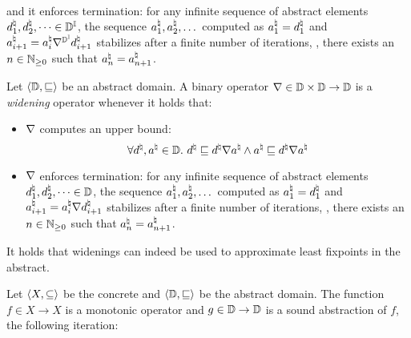\begin{description}
\begin{align*}
  \end{align*}
  and it enforces termination: for any infinite sequence of abstract elements $d^\natural_1, d^\natural_2, \dots \in \mathbb{D}^{\mathbb{I}}$, the sequence $a^\natural_1, a^\natural_2, \dots$ computed as $a^\natural_1 = d^\natural_1$ and $a^\natural_{i+1} = a^\natural_i \nabla^{\mathbb{D}^{\mathbb{I}}} d^\natural_{i+1}$ stabilizes after a finite number of iterations, \ie, there exists an $n \in \mathbb{N}_{\ge0}$ such that $a^\natural_n = a^\natural_{n+1}$.
  \begin{definition}[Widening]
    Let $\langle \mathbb{D}, \sqsubseteq \rangle$ be an abstract domain.
    A binary operator $\nabla\in\mathbb{D}\times\mathbb{D}\to\mathbb{D}$ is a \emph{widening} operator whenever it holds that:
    \begin{itemize}
      \item $\nabla$ computes an upper bound:
      \[\forall d^\natural, a^\natural \in \mathbb{D}.~ d^\natural \sqsubseteq d^\natural \nabla a^\natural \land a^\natural \sqsubseteq d^\natural \nabla a^\natural\]
      \item $\nabla$ enforces termination: for any infinite sequence of abstract elements $d^\natural_1, d^\natural_2, \dots \in \mathbb{D}$, the sequence $a^\natural_1, a^\natural_2, \dots$ computed as $a^\natural_1 = d^\natural_1$ and $a^\natural_{i+1} = a^\natural_i \nabla d^\natural_{i+1}$ stabilizes after a finite number of iterations, \ie, there exists an $n \in \mathbb{N}_{\ge0}$ such that $a^\natural_n = a^\natural_{n+1}$.
    \end{itemize}
  \end{definition}
  \vspace{5pt}
  It holds that widenings can indeed be used to approximate least fixpoints in the abstract.
  \begin{theorem}
    Let $\langle X, \subseteq \rangle$ be the concrete and $\langle \mathbb{D}, \sqsubseteq \rangle$ be the abstract domain.
    The function $f \in X \to X$ is a monotonic operator and $g \in \mathbb{D} \to \mathbb{D}$ is a sound abstraction of $f$, the following iteration:

\end{theorem}
\end{description}
